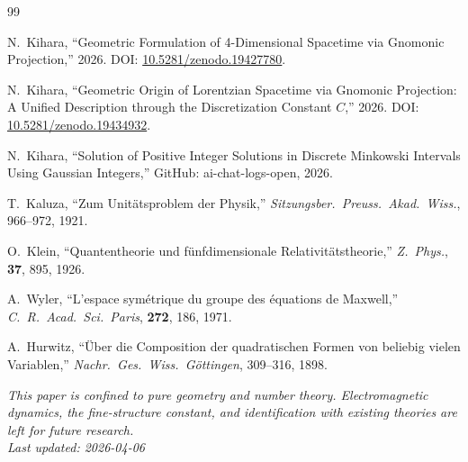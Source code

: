 \documentclass[12pt,a4paper]{article}
\begin{document}
\begin{thebibliography}{99}

N.~Kihara, ``Geometric Formulation of 4-Dimensional Spacetime via Gnomonic Projection,'' 2026.
DOI: \href{https://doi.org/10.5281/zenodo.19427780}{10.5281/zenodo.19427780}.

N.~Kihara, ``Geometric Origin of Lorentzian Spacetime via Gnomonic Projection: A Unified Description through the Discretization Constant $C$,'' 2026.
DOI: \href{https://doi.org/10.5281/zenodo.19434932}{10.5281/zenodo.19434932}.

N.~Kihara, ``Solution of Positive Integer Solutions in Discrete Minkowski Intervals Using Gaussian Integers,'' GitHub: ai-chat-logs-open, 2026.

T.~Kaluza, ``Zum Unit\"{a}tsproblem der Physik,'' \textit{Sitzungsber.\ Preuss.\ Akad.\ Wiss.}, 966--972, 1921.

O.~Klein, ``Quantentheorie und f\"{u}nfdimensionale Relativit\"{a}tstheorie,'' \textit{Z.\ Phys.}, \textbf{37}, 895, 1926.

A.~Wyler, ``L'espace sym\'{e}trique du groupe des \'{e}quations de Maxwell,'' \textit{C.\ R.\ Acad.\ Sci.\ Paris}, \textbf{272}, 186, 1971.

A.~Hurwitz, ``\"{U}ber die Composition der quadratischen Formen von beliebig vielen Variablen,'' \textit{Nachr.\ Ges.\ Wiss.\ G\"{o}ttingen}, 309--316, 1898.

\end{thebibliography}

\bigskip
\noindent\textit{This paper is confined to pure geometry and number theory. Electromagnetic dynamics, the fine-structure constant, and identification with existing theories are left for future research.}\\
\textit{Last updated: 2026-04-06}
\end{document}
